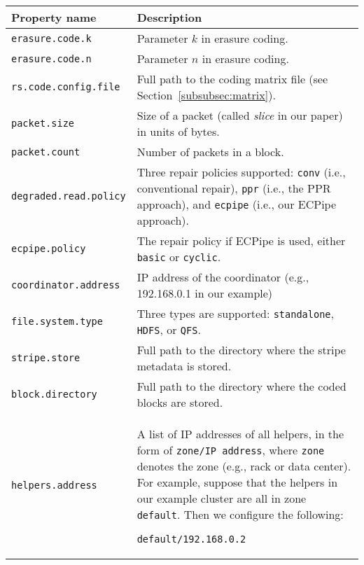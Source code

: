 \documentclass[letterpaper,12pt]{article}
\newcommand{\sysname}{{\sf\small ECPipe}\xspace}
\begin{document}
\begin{table}[!ht]
\centering
\renewcommand{\arraystretch}{1.1}
\small
\begin{tabular}{|p{2in}|p{4.2in}|}
\hline
{\bf Property name} & {\bf Description} \\
\hline
{\tt erasure.code.k} & Parameter $k$ in erasure coding.\\
\hline
{\tt erasure.code.n} & Parameter $n$ in erasure coding.\\
\hline
{\tt rs.code.config.file} & Full path to the coding matrix file (see
Section~\ref{subsubsec:matrix}). \\
\hline
{\tt packet.size} & Size of a packet (called {\em slice} in our paper) in
units of bytes.\\
\hline
{\tt packet.count} & Number of packets in a block. \\
\hline
{\tt degraded.read.policy} &  Three repair policies supported:
{\tt conv} (i.e., conventional repair), {\tt ppr} (i.e., the PPR approach),
and {\tt ecpipe} (i.e., our \sysname approach).\\
\hline
{\tt ecpipe.policy} & The repair policy if \sysname is used, either
{\tt basic} or {\tt cyclic}.\\
\hline
{\tt coordinator.address} & IP address of the coordinator (e.g., 192.168.0.1
in our example)\\
\hline
{\tt file.system.type} & Three types are supported: {\tt standalone},
{\tt HDFS}, or {\tt QFS}.\\
\hline
{\tt stripe.store} & Full path to the directory where the stripe metadata is
stored.\\
\hline
{\tt block.directory} & Full path to the directory where the coded blocks are
stored.\\
\hline
{\tt helpers.address} & A list of IP addresses of all helpers, in the form of
{\tt zone/IP address}, where {\tt zone} denotes the zone (e.g., rack or
data center).  For example, suppose that the helpers in our example cluster
are all in zone {\tt default}.  Then we configure the following:
\parbox[t]{3in}{\tt default/192.168.0.2\\
}
\end{tabular}
\end{table}
\end{document}
